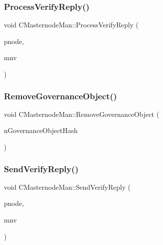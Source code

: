 \mbox{\label{class_c_masternode_man_a9a96a97210dd939754ef496efdf7fe70}} 
\subsubsection{\texorpdfstring{Process\+Verify\+Reply()}{ProcessVerifyReply()}}
{\footnotesize\ttfamily void C\+Masternode\+Man\+::\+Process\+Verify\+Reply (\begin{DoxyParamCaption}\item[{\mbox{\hyperlink{class_c_node}{C\+Node}} $\ast$}]{pnode,  }\item[{\mbox{\hyperlink{class_c_masternode_verification}{C\+Masternode\+Verification}} \&}]{mnv }\end{DoxyParamCaption})}

\mbox{\label{class_c_masternode_man_acdebe963fb623af5a757dd1e42156afe}} 
\subsubsection{\texorpdfstring{Remove\+Governance\+Object()}{RemoveGovernanceObject()}}
{\footnotesize\ttfamily void C\+Masternode\+Man\+::\+Remove\+Governance\+Object (\begin{DoxyParamCaption}\item[{\mbox{\hyperlink{classuint256}{uint256}}}]{n\+Governance\+Object\+Hash }\end{DoxyParamCaption})}

\mbox{\label{class_c_masternode_man_a57016f150d9977cb22c08ba5cfa3f190}} 
\subsubsection{\texorpdfstring{Send\+Verify\+Reply()}{SendVerifyReply()}}
{\footnotesize\ttfamily void C\+Masternode\+Man\+::\+Send\+Verify\+Reply (\begin{DoxyParamCaption}\item[{\mbox{\hyperlink{class_c_node}{C\+Node}} $\ast$}]{pnode,  }\item[{\mbox{\hyperlink{class_c_masternode_verification}{C\+Masternode\+Verification}} \&}]{mnv }\end{DoxyParamCaption})}

